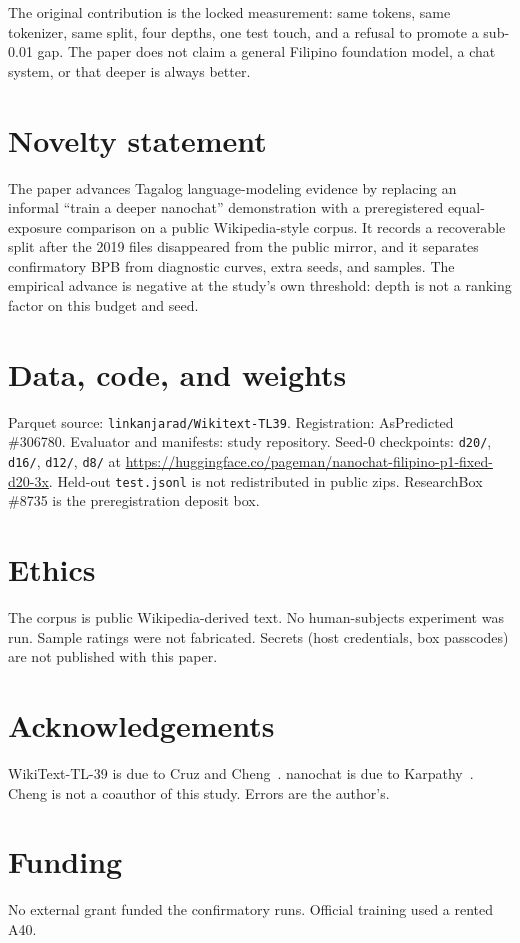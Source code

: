 \documentclass[11pt,a4paper]{article}
\begin{document}
The original contribution is the locked measurement: same tokens, same tokenizer, same split, four depths, one test touch, and a refusal to promote a sub-0.01 gap. The paper does not claim a general Filipino foundation model, a chat system, or that deeper is always better.

\section*{Novelty statement}
The paper advances Tagalog language-modeling evidence by replacing an informal ``train a deeper nanochat'' demonstration with a preregistered equal-exposure comparison on a public Wikipedia-style corpus. It records a recoverable split after the 2019 files disappeared from the public mirror, and it separates confirmatory BPB from diagnostic curves, extra seeds, and samples. The empirical advance is negative at the study's own threshold: depth is not a ranking factor on this budget and seed.

\section*{Data, code, and weights}
Parquet source: \texttt{linkanjarad/Wikitext-TL39}. Registration: AsPredicted \#306780. Evaluator and manifests: study repository. Seed-0 checkpoints: \texttt{d20/}, \texttt{d16/}, \texttt{d12/}, \texttt{d8/} at \url{https://huggingface.co/pageman/nanochat-filipino-p1-fixed-d20-3x}. Held-out \texttt{test.jsonl} is not redistributed in public zips. ResearchBox \#8735 is the preregistration deposit box.

\section*{Ethics}
The corpus is public Wikipedia-derived text. No human-subjects experiment was run. Sample ratings were not fabricated. Secrets (host credentials, box passcodes) are not published with this paper.

\section*{Acknowledgements}
WikiText-TL-39 is due to Cruz and Cheng~\cite{cruz2019eval}. nanochat is due to Karpathy~\cite{karpathy2026nanochat}. Cheng is not a coauthor of this study. Errors are the author's.

\section*{Funding}
No external grant funded the confirmatory runs. Official training used a rented A40.
\end{document}
